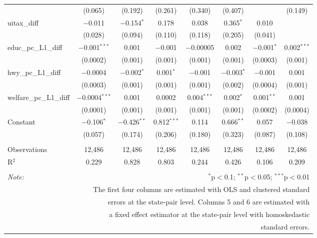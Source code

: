 \begin{table}[!htbp]
\begin{tabular}{@{\extracolsep{5pt}}lccccccc}
  & (0.065) & (0.192) & (0.261) & (0.340) & (0.407) &  & (0.149) \\ 
  uitax\_diff & $-$0.011 & $-$0.154$^{*}$ & 0.178 & 0.038 & 0.365$^{*}$ & 0.010 &  \\ 
  & (0.028) & (0.094) & (0.110) & (0.118) & (0.205) & (0.041) &  \\ 
  educ\_pc\_L1\_diff & $-$0.001$^{***}$ & 0.001 & $-$0.001 & $-$0.00005 & 0.002 & $-$0.001$^{*}$ & 0.002$^{***}$ \\ 
  & (0.0002) & (0.001) & (0.001) & (0.001) & (0.001) & (0.0003) & (0.001) \\ 
  hwy\_pc\_L1\_diff & $-$0.0004 & $-$0.002$^{*}$ & 0.001$^{*}$ & $-$0.001 & $-$0.003$^{*}$ & $-$0.001 & 0.001 \\ 
  & (0.0003) & (0.001) & (0.001) & (0.001) & (0.002) & (0.0004) & (0.001) \\ 
  welfare\_pc\_L1\_diff & $-$0.0004$^{***}$ & 0.001 & 0.0002 & 0.004$^{***}$ & 0.002$^{*}$ & 0.001$^{**}$ & 0.001 \\ 
  & (0.0001) & (0.001) & (0.001) & (0.001) & (0.001) & (0.0002) & (0.0004) \\ 
  Constant & $-$0.106$^{*}$ & $-$0.426$^{**}$ & 0.812$^{***}$ & 0.114 & 0.666$^{**}$ & 0.057 & $-$0.038 \\ 
  & (0.057) & (0.174) & (0.206) & (0.180) & (0.323) & (0.087) & (0.108) \\ 
 \hline \\[-1.8ex] 
Observations & 12,486 & 12,486 & 12,486 & 12,486 & 12,486 & 12,486 & 12,486 \\ 
R$^{2}$ & 0.229 & 0.828 & 0.803 & 0.244 & 0.426 & 0.106 & 0.209 \\ 
\hline 
\hline \\[-1.8ex] 
\textit{Note:}  & \multicolumn{7}{r}{$^{*}$p$<$0.1; $^{**}$p$<$0.05; $^{***}$p$<$0.01} \\ 
 & \multicolumn{7}{r}{The first four columns are estimated with OLS and clustered standard} \\ 
 & \multicolumn{7}{r}{ errors at the state-pair level. Columns 5 and 6 are estimated with} \\ 
 & \multicolumn{7}{r}{a fixed effect estimator at the state-pair level with homoskedastic} \\ 
 & \multicolumn{7}{r}{standard errors.} \\ 
\end{tabular} 
\end{table} 
